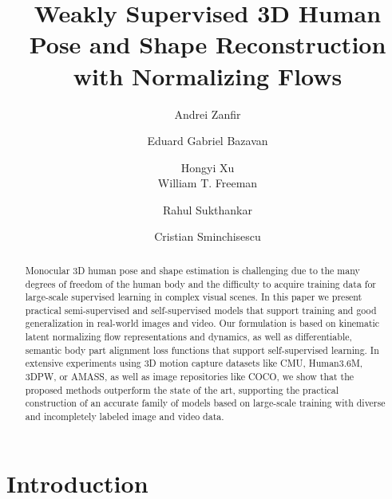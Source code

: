 \documentclass[runningheads]{llncs}
\begin{document}
\pagestyle{headings}
\mainmatter
\def\ECCVSubNumber{6296}  

\title{Weakly Supervised 3D Human Pose and Shape Reconstruction with Normalizing Flows} 

\begin{comment}
\titlerunning{ECCV-20 submission ID \ECCVSubNumber} 
\authorrunning{ECCV-20 submission ID \ECCVSubNumber} 
\author{Anonymous ECCV submission}
\institute{Paper ID \ECCVSubNumber}
\end{comment}


\author{Andrei Zanfir \and
Eduard Gabriel Bazavan \and
Hongyi Xu \\
William T. Freeman \and
Rahul Sukthankar \and
Cristian Sminchisescu}
\maketitle

\begin{abstract}
Monocular 3D human pose and shape estimation is challenging due to the many degrees of freedom of the human body and the difficulty to acquire training data for large-scale supervised learning in complex visual scenes.
In this paper we present practical semi-supervised and self-supervised models that support training and good generalization in real-world images and video. 
Our formulation is based on kinematic latent normalizing flow representations and dynamics, as well as differentiable, semantic body part alignment loss functions that support self-supervised learning. 
In extensive experiments using 3D motion capture datasets like CMU, Human3.6M, 3DPW, or AMASS, as well as image repositories like COCO, we show that the proposed methods outperform the state of the art, supporting the practical construction of an accurate family of models based on large-scale training with diverse and incompletely labeled image and video data.

\end{abstract}

\section{Introduction}
\end{document}
